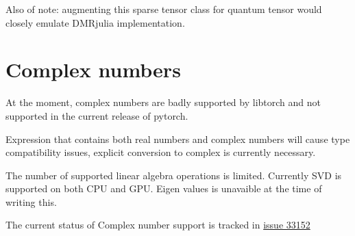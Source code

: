 \documentclass[15pt]{article}
\begin{document}
Also of note: augmenting this sparse tensor class for quantum tensor would closely emulate DMRjulia implementation.

\section{Complex numbers}
At the moment, complex numbers are badly supported by libtorch and not supported in the current release of pytorch.

Expression that contains both real numbers and complex numbers will cause type compatibility issues, explicit conversion to complex is currently necessary.

The number of supported linear algebra operations is limited. Currently SVD is supported on both CPU and GPU.
Eigen values is unavaible at the time of writing this.

The current status of Complex number support is tracked in \href{https://github.com/pytorch/pytorch/issues/33152}{issue 33152}
\end{document}
